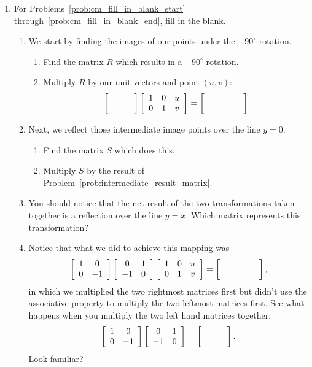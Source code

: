 \documentclass[../textbook.tex]{subfiles}
\begin{document}
\begin{enumerate}
\item For Problems~\ref{prob:cm_fill_in_blank_start} through~\ref{prob:cm_fill_in_blank_end}, fill in the blank.
\begin{enumerate}
\item We start by finding the images of our points under the $-90^\circ$ rotation. \label{prob:cm_fill_in_blank_start}
\begin{enumerate}
\item Find the matrix $R$ which results in a $-90^\circ$ rotation.
\item  \label{prob:intermediate_result_matrix} Multiply $R$ by our unit vectors and point $(u,v)$: $$\blanktwomat\left[\begin{array}{ccc} 1 & 0 & u \\ 0 & 1 & v \end{array}\right] = \left[\phantom{\begin{array}{ccc} 1 & 0 & u \\ 0 & 1 & v \end{array}}\right]$$
\end{enumerate}
\item Next, we reflect those intermediate image points over the line $y=0$.
\begin{enumerate}
\item Find the matrix $S$ which does this.
\item Multiply $S$ by the result of Problem~\ref{prob:intermediate_result_matrix}.
\end{enumerate}
\item You should notice that the net result of the two transformations taken together is a reflection over the line $y=x$. Which matrix represents this transformation?
\item Notice that what we did to achieve this mapping was $$\twomat{1}{0}{0}{-1}\twomat{0}{1}{-1}{0}\left[\begin{array}{ccc} 1 & 0 & u \\ 0 & 1 & v \end{array}\right]=\left[\phantom{\begin{array}{ccc} 1 & 0 & u \\ 0 & 1 & v \end{array}}\right],$$
in which we multiplied the two rightmost matrices first but didn't use the associative property to multiply the two leftmost matrices first. See what happens when you multiply the two left hand matrices together: $$\twomat{1}{0}{0}{-1}\twomat{0}{1}{-1}{0}=\blanktwomat.$$ Look familiar?

\end{enumerate}
\end{enumerate}
\end{document}
